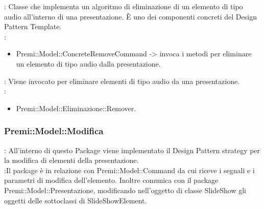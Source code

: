 {{{				\textbf{\tipo}: Classe che implementa un algoritmo di eliminazione di un elemento di tipo audio all’interno di una presentazione.
È uno dei componenti concreti del Design Pattern Template.\\	
				\textbf{\relaz}: 
				\begin{itemize}
					\item Premi::Model::ConcreteRemoveCommand -> invoca i metodi per eliminare un elemento di tipo audio dalla presentazione.
				\end{itemize} 
				\textbf{\interfacce}: Viene invocato per eliminare elementi di tipo audio da una presentazione.\\
                \textbf{\base}: 
                    \begin{itemize}
                    \item Premi::Model::Eliminazione::Remover.
                    \end{itemize}
			}
	}
   \subsubsection{Premi::Model::Modifica}{
		\textbf{\tipo}: All’interno di questo Package viene implementato il Design Pattern strategy per la modifica di elementi della presentazione.\\
		\textbf{\relaz}:Il package è in relazione con Premi::Model::Command da cui riceve i segnali e i parametri di modifica dell’elemento. Inoltre comunica con il package Premi::Model::Presentazione, modificando nell’oggetto di classe SlideShow gli oggetti delle sottoclassi di SlideShowElement.\\
	
}}
